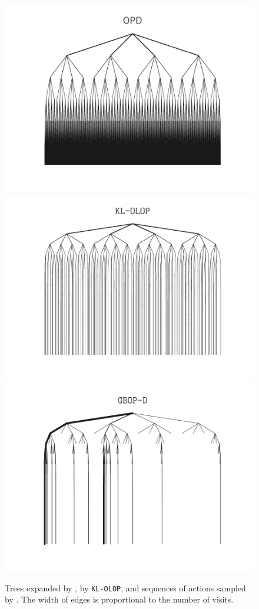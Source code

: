 \documentclass[runningheads]{llncs}
\begin{document}
\begin{figure}[tp]
	\centering
	\includegraphics[trim={0 0.5cm 0 0.5cm}, clip, width=0.85\linewidth]{img/tree_OPD.pdf}
    \includegraphics[trim={0 0.5cm 0 0.5cm}, clip, width=0.85\linewidth]{img/tree_KL-OLOP.pdf}
	\includegraphics[trim={0 0.5cm 0 0.5cm}, clip, width=0.85\linewidth]{img/tree_GBOP-D.pdf}
	\caption{Trees expanded by \OPD, by \texttt{KL-OLOP}, and sequences of actions sampled by \GBOPD. The width of edges is proportional to the number of visits.}
	\label{fig:suppl-trees}
\end{figure}
\end{document}
